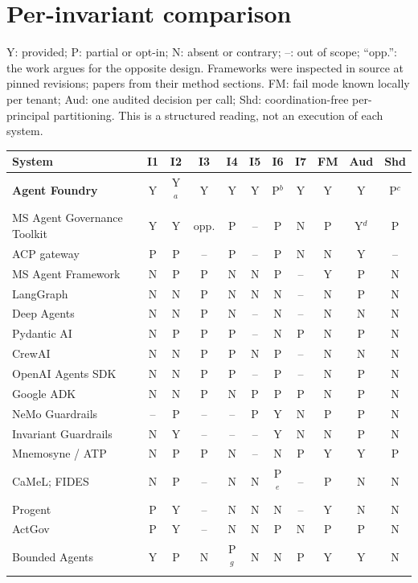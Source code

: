 \section{Per-invariant comparison}
\label{app:related}
Y: provided; P: partial or opt-in; N: absent or contrary; --: out of scope; ``opp.'': the work argues for the opposite design. Frameworks were inspected in source at pinned revisions; papers from their method sections. FM: fail mode known locally per tenant; Aud: one audited decision per call; Shd: coordination-free per-principal partitioning. This is a structured reading, not an execution of each system.

\begin{table}[h]
\centering\scriptsize
\setlength{\tabcolsep}{3pt}
\begin{tabular}{lcccccccccc}
\toprule
System & I1 & I2 & I3 & I4 & I5 & I6 & I7 & FM & Aud & Shd \\
\midrule
\textbf{Agent Foundry} & Y & Y$^a$ & Y & Y & Y & P$^b$ & Y & Y & Y & P$^c$ \\
MS Agent Governance Toolkit & Y & Y & opp. & P & -- & P & N & P & Y$^d$ & P \\
ACP gateway & P & P & -- & P & -- & P & N & N & Y & -- \\
MS Agent Framework & N & P & P & N & N & P & -- & Y & P & N \\
LangGraph & N & N & P & N & N & N & -- & N & P & N \\
Deep Agents & N & N & P & N & -- & N & -- & N & N & N \\
Pydantic AI & N & P & P & P & -- & N & P & N & P & N \\
CrewAI & N & N & P & P & N & P & -- & N & N & N \\
OpenAI Agents SDK & N & N & P & P & -- & P & -- & N & P & N \\
Google ADK & N & N & P & N & P & P & P & N & P & N \\
NeMo Guardrails & -- & P & -- & -- & P & Y & N & P & P & N \\
Invariant Guardrails & N & Y & -- & -- & -- & Y & N & N & P & N \\
Mnemosyne / ATP & N & P & P & N & -- & N & P & Y & Y & P \\
CaMeL; FIDES & N & P & -- & N & N & P$^e$ & -- & P & N & N \\
Progent & P & Y & -- & N & N & N & -- & Y & N & N \\
ActGov & P & Y & -- & N & N & P & N & P & P & N \\
Bounded Agents & Y & P & N & P$^g$ & N & N & P & Y & Y & N \\

\end{tabular}
\end{table}
